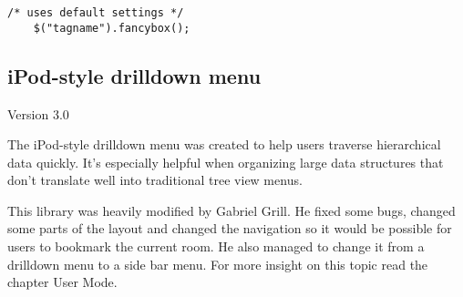 \begin{lstlisting}[caption=how to fancybox,label=lst:plugin:fancybox]
    /* uses default settings */
    $("tagname").fancybox();
\end{lstlisting}


\subsection{iPod-style drilldown menu}
    Version  3.0

The iPod-style drilldown menu was created to help users traverse hierarchical data quickly. It's especially helpful when organizing large data structures that don't translate well into traditional tree view menus.

This library was heavily modified by Gabriel Grill. He fixed some bugs, changed some parts of the layout and changed the navigation so it would be possible for users to bookmark the current room. He also managed to change it from a drilldown menu to a side bar menu. For more insight on this topic read the chapter User Mode. 